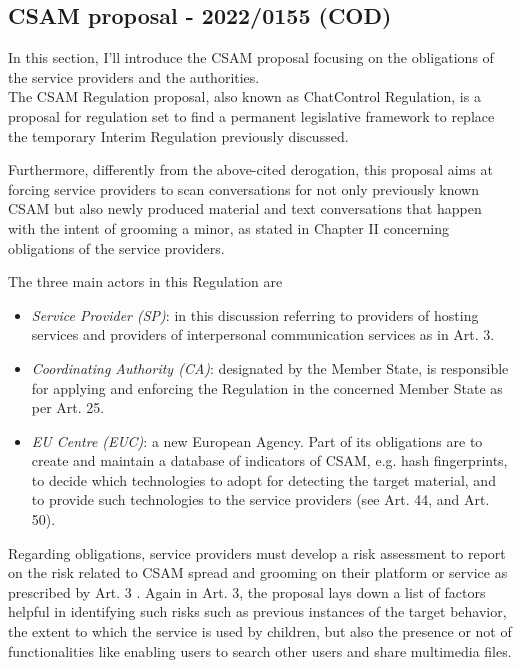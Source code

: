 \subsection{CSAM proposal - 2022/0155 (COD)}

In this section, I'll introduce the CSAM proposal focusing on the obligations of the service providers and the authorities. \\

The CSAM Regulation proposal, also known as ChatControl Regulation, is a proposal for regulation set to find a permanent legislative framework to replace the temporary Interim Regulation previously discussed. 

Furthermore, differently from the above-cited derogation, this proposal aims at forcing service providers to scan conversations for not only previously known CSAM but also newly produced material and text conversations that happen with the intent of grooming a minor, as stated in Chapter II concerning obligations of the service providers\cite{eu2023chatcontrol}.

The three main actors in this Regulation are

\begin{itemize}
    \item \textit{Service Provider (SP)}: in this discussion referring to providers of hosting services and providers of interpersonal communication services as in Art. 3.
    \item \textit{Coordinating Authority (CA)}: designated by the Member State, is responsible for applying and enforcing the Regulation in the concerned Member State as per Art. 25.
    \item \textit{EU Centre (EUC)}: a new European Agency. Part of its obligations are to create and maintain a database of indicators of CSAM, e.g. hash fingerprints, to decide which technologies to adopt for detecting the target material, and to provide such technologies to the service providers (see Art. 44, and Art. 50).
\end{itemize}

Regarding obligations, service providers must develop a risk assessment to report on the risk related to CSAM spread and grooming on their platform or service as prescribed by Art. 3 \cite{eu2023chatcontrol}. 
Again in Art. 3, the proposal lays down a list of factors helpful in identifying such risks such as previous instances of the target behavior, the extent to which the service is used by children, but also the presence or not of functionalities like enabling users to search other users and share multimedia files.

